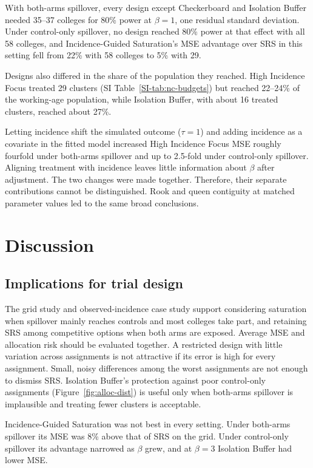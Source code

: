 \documentclass[Afour,sagev,times]{sagej}
\begin{document}
With both-arms spillover, every design except Checkerboard and Isolation Buffer needed 35--37 colleges for 80\% power at $\beta=1$, one residual standard deviation. Under control-only spillover, no design reached 80\% power at that effect with all 58 colleges, and Incidence-Guided Saturation's MSE advantage over SRS in this setting fell from 22\% with 58 colleges to 5\% with 29.

Designs also differed in the share of the population they reached. High Incidence Focus treated 29 clusters (SI Table~\ref{SI-tab:nc-budgets}) but reached 22--24\% of the working-age population, while Isolation Buffer, with about 16 treated clusters, reached about 27\%.

Letting incidence shift the simulated outcome ($\tau=1$) and adding incidence as a covariate in the fitted model increased High Incidence Focus MSE roughly fourfold under both-arms spillover and up to 2.5-fold under control-only spillover. Aligning treatment with incidence leaves little information about $\beta$ after adjustment. The two changes were made together. Therefore, their separate contributions cannot be distinguished. Rook and queen contiguity at matched parameter values led to the same broad conclusions.

\section{Discussion}
\subsection{Implications for trial design}
The grid study and observed-incidence case study support considering saturation when spillover mainly reaches controls and most colleges take part, and retaining SRS among competitive options when both arms are exposed. Average MSE and allocation risk should be evaluated together. A restricted design with little variation across assignments is not attractive if its error is high for every assignment. Small, noisy differences among the worst assignments are not enough to dismiss SRS. Isolation Buffer's protection against poor control-only assignments (Figure~\ref{fig:alloc-dist}) is useful only when both-arms spillover is implausible and treating fewer clusters is acceptable.

Incidence-Guided Saturation was not best in every setting. Under both-arms spillover its MSE was 8\% above that of SRS on the grid. Under control-only spillover its advantage narrowed as $\beta$ grew, and at $\beta=3$ Isolation Buffer had lower MSE.
\end{document}
